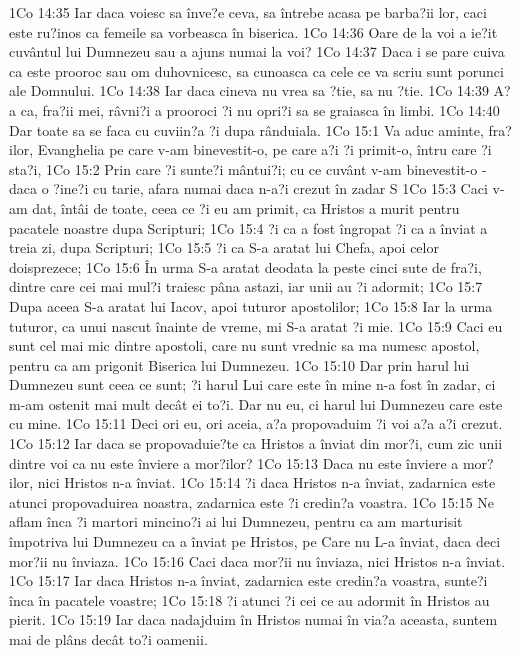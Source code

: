 1Co 14:35  Iar daca voiesc sa înve?e ceva, sa întrebe acasa pe barba?ii lor, caci este ru?inos ca femeile sa vorbeasca în biserica.
1Co 14:36  Oare de la voi a ie?it cuvântul lui Dumnezeu sau a ajuns numai la voi?
1Co 14:37  Daca i se pare cuiva ca este prooroc sau om duhovnicesc, sa cunoasca ca cele ce va scriu sunt porunci ale Domnului.
1Co 14:38  Iar daca cineva nu vrea sa ?tie, sa nu ?tie.
1Co 14:39  A?a ca, fra?ii mei, râvni?i a prooroci ?i nu opri?i sa se graiasca în limbi.
1Co 14:40  Dar toate sa se faca cu cuviin?a ?i dupa rânduiala.
1Co 15:1  Va aduc aminte, fra?ilor, Evanghelia pe care v-am binevestit-o, pe care a?i ?i primit-o, întru care ?i sta?i,
1Co 15:2  Prin care ?i sunte?i mântui?i; cu ce cuvânt v-am binevestit-o - daca o ?ine?i cu tarie, afara numai daca n-a?i crezut în zadar S
1Co 15:3  Caci v-am dat, întâi de toate, ceea ce ?i eu am primit, ca Hristos a murit pentru pacatele noastre dupa Scripturi;
1Co 15:4  ?i ca a fost îngropat ?i ca a înviat a treia zi, dupa Scripturi;
1Co 15:5  ?i ca S-a aratat lui Chefa, apoi celor doisprezece;
1Co 15:6  În urma S-a aratat deodata la peste cinci sute de fra?i, dintre care cei mai mul?i traiesc pâna astazi, iar unii au ?i adormit;
1Co 15:7  Dupa aceea S-a aratat lui Iacov, apoi tuturor apostolilor;
1Co 15:8  Iar la urma tuturor, ca unui nascut înainte de vreme, mi S-a aratat ?i mie.
1Co 15:9  Caci eu sunt cel mai mic dintre apostoli, care nu sunt vrednic sa ma numesc apostol, pentru ca am prigonit Biserica lui Dumnezeu.
1Co 15:10  Dar prin harul lui Dumnezeu sunt ceea ce sunt; ?i harul Lui care este în mine n-a fost în zadar, ci m-am ostenit mai mult decât ei to?i. Dar nu eu, ci harul lui Dumnezeu care este cu mine.
1Co 15:11  Deci ori eu, ori aceia, a?a propovaduim ?i voi a?a a?i crezut.
1Co 15:12  Iar daca se propovaduie?te ca Hristos a înviat din mor?i, cum zic unii dintre voi ca nu este înviere a mor?ilor?
1Co 15:13  Daca nu este înviere a mor?ilor, nici Hristos n-a înviat.
1Co 15:14  ?i daca Hristos n-a înviat, zadarnica este atunci propovaduirea noastra, zadarnica este ?i credin?a voastra.
1Co 15:15  Ne aflam înca ?i martori mincino?i ai lui Dumnezeu, pentru ca am marturisit împotriva lui Dumnezeu ca a înviat pe Hristos, pe Care nu L-a înviat, daca deci mor?ii nu înviaza.
1Co 15:16  Caci daca mor?ii nu înviaza, nici Hristos n-a înviat.
1Co 15:17  Iar daca Hristos n-a înviat, zadarnica este credin?a voastra, sunte?i înca în pacatele voastre;
1Co 15:18  ?i atunci ?i cei ce au adormit în Hristos au pierit.
1Co 15:19  Iar daca nadajduim în Hristos numai în via?a aceasta, suntem mai de plâns decât to?i oamenii.
